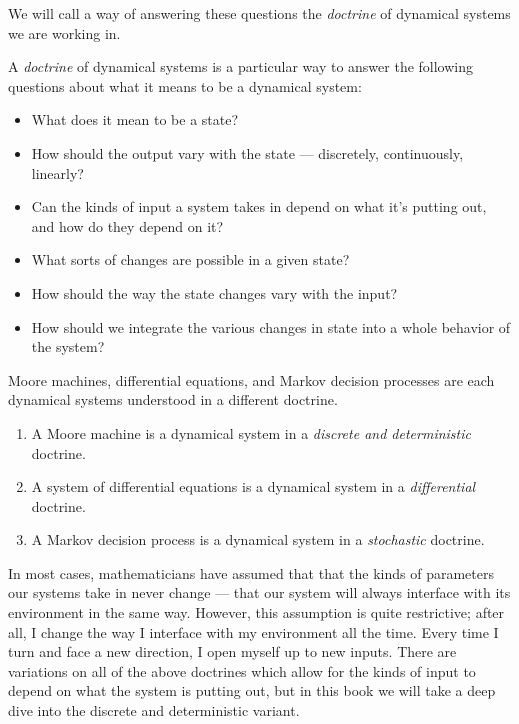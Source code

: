 \documentclass[DynamicalBook]{subfiles}
\begin{document}
We will call a way of answering these questions the \emph{doctrine} of dynamical
systems we are working in.
\begin{informal}\label{informal.doctrine}
  A \emph{doctrine} of dynamical systems is a particular way to answer the following
  questions about what it means to be a dynamical system:
  \begin{itemize}
  \item What does it mean to be a state?
  \item How should the output vary with the state --- discretely,
    continuously, linearly?
  \item Can the kinds of input a
    system takes in depend on what it's putting out, and how do they depend on it?
  \item What sorts of changes are possible in a given state?
  \item How should the way the state changes vary with the input?
  \item How should we integrate the various changes in state into a whole
    behavior of the system?
  \end{itemize}
\end{informal}

Moore machines, differential equations, and Markov decision processes are each
dynamical systems understood in a different doctrine.
\begin{enumerate}
  \item A Moore machine is a dynamical system in a \emph{discrete and
      deterministic} doctrine.
  \item A system of differential equations is a dynamical system in a
    \emph{differential} doctrine.
  \item A Markov decision process is a dynamical system in a \emph{stochastic} doctrine.
\end{enumerate}

In most cases, mathematicians have assumed that that the kinds of parameters our systems take in
never change --- that our system will always interface with
    its environment in the same way. However, this assumption is quite
    restrictive; after all, I change the way I interface with my environment all
    the time. Every time I turn and face a new direction, I open myself up to
    new inputs. There are variations on all of the above doctrines which allow for the
    kinds of input to depend on what the system is putting out, but in this book
    we will take a deep dive into the discrete and deterministic variant.
\end{document}
